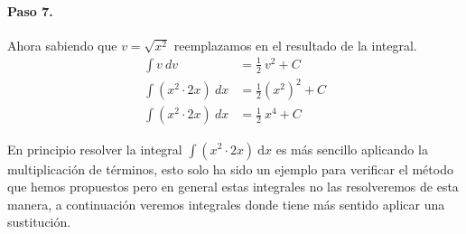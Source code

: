 \documentclass[11pt,letterpaper,oneside]{book}
\numberwithin{equation}{section}
\newcommand{\inti}[2]{\int #1 \text{d}#2}
\newcommand{\intii}[4]{ \int #1 d#4 #3 = #2 +C}
\begin{document}
	\paragraph{Paso 7. } Ahora sabiendo que $v= \sqrt{x^2}$ reemplazamos en el resultado de la integral.
	\begin{align*}
		\intii{v\ }{\frac{1}{2}\ v^2}{&}{v} \\
		\intii{(x^2\cdot 2x)\ }{\frac{1}{2} (x^2)^2}{&}{x} \\
		\intii{(x^2\cdot 2x)\ }{\frac{1}{2}\ x^4}{&}{x}
	\end{align*}

	\par En principio resolver la integral $\inti{(x^2\cdot 2x)\ }{x}$ es más sencillo aplicando la multiplicación de términos, esto solo ha sido un ejemplo para verificar el método que hemos propuestos pero en general estas integrales no las resolveremos de esta manera, a continuación veremos integrales donde tiene más sentido aplicar una sustitución.
	\newpage
	\printbibliography	
\end{document}

